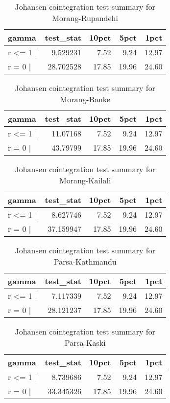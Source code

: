 \documentclass[12pt,]{article}
\begin{document}
\begin{longtable}[t]{lrrrr}
\caption{\label{tab:rice-cajo-test}Johansen cointegration test summary for Morang-Rupandehi}\\
\toprule
gamma & test\_stat & 10pct & 5pct & 1pct\\
\midrule
r <= 1 | & 9.529231 & 7.52 & 9.24 & 12.97\\
r = 0  | & 28.702528 & 17.85 & 19.96 & 24.60\\
\bottomrule
\end{longtable}

\begin{longtable}[t]{lrrrr}
\caption{\label{tab:rice-cajo-test}Johansen cointegration test summary for Morang-Banke}\\
\toprule
gamma & test\_stat & 10pct & 5pct & 1pct\\
\midrule
r <= 1 | & 11.07168 & 7.52 & 9.24 & 12.97\\
r = 0  | & 43.79799 & 17.85 & 19.96 & 24.60\\
\bottomrule
\end{longtable}

\begin{longtable}[t]{lrrrr}
\caption{\label{tab:rice-cajo-test}Johansen cointegration test summary for Morang-Kailali}\\
\toprule
gamma & test\_stat & 10pct & 5pct & 1pct\\
\midrule
r <= 1 | & 8.627746 & 7.52 & 9.24 & 12.97\\
r = 0  | & 37.159947 & 17.85 & 19.96 & 24.60\\
\bottomrule
\end{longtable}

\begin{longtable}[t]{lrrrr}
\caption{\label{tab:rice-cajo-test}Johansen cointegration test summary for Parsa-Kathmandu}\\
\toprule
gamma & test\_stat & 10pct & 5pct & 1pct\\
\midrule
r <= 1 | & 7.117339 & 7.52 & 9.24 & 12.97\\
r = 0  | & 28.121237 & 17.85 & 19.96 & 24.60\\
\bottomrule
\end{longtable}

\begin{longtable}[t]{lrrrr}
\caption{\label{tab:rice-cajo-test}Johansen cointegration test summary for Parsa-Kaski}\\
\toprule
gamma & test\_stat & 10pct & 5pct & 1pct\\
\midrule
r <= 1 | & 8.739686 & 7.52 & 9.24 & 12.97\\
r = 0  | & 33.345326 & 17.85 & 19.96 & 24.60\\
\bottomrule
\end{longtable}
\end{document}
